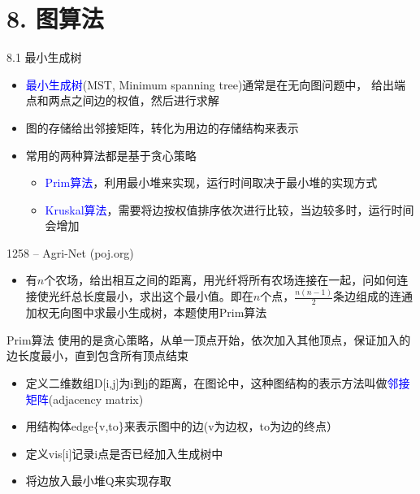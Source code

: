 


\frame{\titlepage}
\section{8. 图算法}
\begin{frame}{8.1 最小生成树}
    \begin{itemize}
        \item \textcolor{blue}{最小生成树}(MST, Minimum spanning tree)通常是在无向图问题中， 给出端点和两点之间边的权值，然后进行求解
        \item 图的存储给出邻接矩阵，转化为用边的存储结构来表示
        \item 常用的两种算法都是基于贪心策略
        \begin{itemize}
            \item \textcolor{blue}{Prim算法}，利用最小堆来实现，运行时间取决于最小堆的实现方式
            \item \textcolor{blue}{Kruskal算法}，需要将边按权值排序依次进行比较，当边较多时，运行时间会增加
        \end{itemize}
    \end{itemize}
\end{frame}
\begin{frame}{1258 -- Agri-Net (poj.org)}
    \begin{itemize}
        \item 有$n$个农场，给出相互之间的距离，用光纤将所有农场连接在一起，问如何连接使光纤总长度最小，求出这个最小值。即在$n$个点，$\frac {n(n-1)}{2}$条边组成的连通加权无向图中求最小生成树，本题使用Prim算法
    \end{itemize}
    \begin{block}{Prim算法}
        \quad 使用的是贪心策略，从单一顶点开始，依次加入其他顶点，保证加入的边长度最小，直到包含所有顶点结束
    \end{block}
    \begin{itemize}
        \item 定义二维数组D[i,j]为i到j的距离，在图论中，这种图结构的表示方法叫做\textcolor{blue}{邻接矩阵}(adjacency matrix)
        \item 用结构体edge\{v,to\}来表示图中的边(v为边权，to为边的终点）
        \item 定义vis[i]记录i点是否已经加入生成树中
        \item 将边放入最小堆Q来实现存取
    \end{itemize}
\end{frame}
